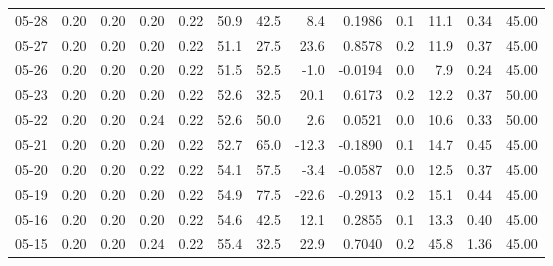 \begin{threeparttable}
{\begin{tabular}{lrrrrrrrrrrrr}
  05-28 &          0.20 &          0.20 &          0.20 &        0.22 &                50.9 &                42.5 &        8.4 &       0.1986 &                 0.1 &             11.1 &            0.34 &                  45.00 \\
  05-27 &          0.20 &          0.20 &          0.20 &        0.22 &                51.1 &                27.5 &       23.6 &       0.8578 &                 0.2 &             11.9 &            0.37 &                  45.00 \\
  05-26 &          0.20 &          0.20 &          0.20 &        0.22 &                51.5 &                52.5 &       -1.0 &      -0.0194 &                 0.0 &              7.9 &            0.24 &                  45.00 \\
  05-23 &          0.20 &          0.20 &          0.20 &        0.22 &                52.6 &                32.5 &       20.1 &       0.6173 &                 0.2 &             12.2 &            0.37 &                  50.00 \\
  05-22 &          0.20 &          0.20 &          0.24 &        0.22 &                52.6 &                50.0 &        2.6 &       0.0521 &                 0.0 &             10.6 &            0.33 &                  50.00 \\
  05-21 &          0.20 &          0.20 &          0.20 &        0.22 &                52.7 &                65.0 &      -12.3 &      -0.1890 &                 0.1 &             14.7 &            0.45 &                  45.00 \\
  05-20 &          0.20 &          0.20 &          0.22 &        0.22 &                54.1 &                57.5 &       -3.4 &      -0.0587 &                 0.0 &             12.5 &            0.37 &                  45.00 \\
  05-19 &          0.20 &          0.20 &          0.20 &        0.22 &                54.9 &                77.5 &      -22.6 &      -0.2913 &                 0.2 &             15.1 &            0.44 &                  45.00 \\
  05-16 &          0.20 &          0.20 &          0.20 &        0.22 &                54.6 &                42.5 &       12.1 &       0.2855 &                 0.1 &             13.3 &            0.40 &                  45.00 \\
  05-15 &          0.20 &          0.20 &          0.24 &        0.22 &                55.4 &                32.5 &       22.9 &       0.7040 &                 0.2 &             45.8 &            1.36 &                  45.00 \\

\end{tabular}}
\end{threeparttable}

